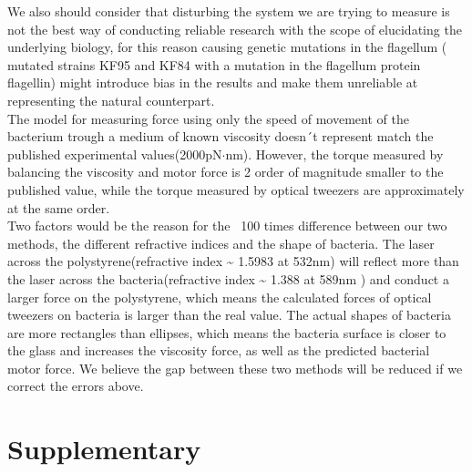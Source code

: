 \documentclass[a4paper,english,12pt,bibliography=totoc]{scrreprt}
\begin{document}
We also should consider that disturbing the system we are trying to measure is not the best way of conducting reliable research with the scope of elucidating the underlying biology, for this reason causing genetic mutations in the flagellum ( mutated strains KF95 and KF84 with a mutation in the flagellum protein flagellin) might introduce bias in the results and make them unreliable at representing the natural counterpart.\\

The model for measuring force using only the speed of movement of the bacterium trough a medium of known viscosity doesn´t represent match the published experimental
values(2000pN$\cdot$nm)\cite{doi:10.1073/pnas.1501734112}. However, the torque measured by balancing the viscosity and motor force is 2 order of magnitude smaller to the published value, while the torque measured by optical tweezers are approximately at the same order.\\

Two factors would be the reason for the ~100 times difference between our two methods, the different refractive indices and the shape of bacteria. The laser across the polystyrene(refractive index \textasciitilde{} 1.5983 at 532nm) \cite{noauthor_refractive_nodate} will reflect more than the laser across the bacteria(refractive index \textasciitilde{} 1.388 at 589nm ) \cite{balaev_refractive_2002} and conduct a larger force on the polystyrene, which means the calculated forces of optical tweezers on bacteria is larger than the real value. The actual shapes of bacteria are more rectangles than ellipses, which means the bacteria surface is closer to the glass and increases the viscosity force, as well as the predicted bacterial motor force. We believe the gap between these two methods will be reduced if we correct the errors above.






\chapter{Supplementary}
\label{cha:Supplementary}
\end{document}
